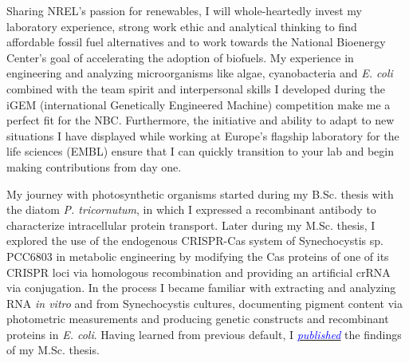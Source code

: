 \documentclass[11pt,a4paper,sans]{moderncv}
\date{\today}
\begin{document}
     
\makelettertitle
\begin{spacing}{1.2}


Sharing NREL's passion for renewables, I will whole-heartedly invest my laboratory experience, strong work ethic and analytical thinking to find affordable fossil fuel alternatives and to work towards the National Bioenergy Center's goal of accelerating the adoption of biofuels.
My experience in engineering and analyzing microorganisms like algae, cyanobacteria and \textit{E. coli} combined with the team spirit and interpersonal skills I developed during the iGEM (international Genetically Engineered Machine) competition make me a perfect fit for the NBC. 
Furthermore, the initiative and ability to adapt to new situations I have displayed while working at Europe's flagship laboratory for the life sciences (EMBL) ensure that I can quickly transition to your lab and begin making contributions from day one.\par\vspace*{3mm}


My journey with photosynthetic organisms started during my B.Sc. thesis with the diatom \textit{P. tricornutum}, in which I expressed a recombinant antibody to characterize intracellular protein transport. 
Later during my M.Sc. thesis, I explored the use of the endogenous CRISPR-Cas system of Synechocystis sp. PCC6803 in metabolic engineering by modifying the Cas proteins of one of its CRISPR loci via homologous recombination and providing an artificial crRNA via conjugation.
In the process I became familiar with extracting and analyzing RNA \textit{in vitro} and from Synechocystis cultures, documenting pigment content via photometric measurements and producing genetic constructs and recombinant proteins in \textit{E. coli}.
Having learned from previous default, I  {\href{https://www.tandfonline.com/eprint/vmAQ3vjYGdZIZpIKQTIT/full}{\textcolor{blue}{{\textit{published}}}}} the findings of my M.Sc. thesis.
\par\vspace*{3mm}
 

\end{spacing}
\end{document}

